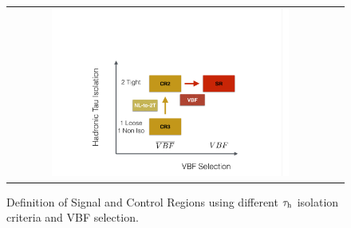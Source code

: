 \begin{figure}[tbh!]
	\centering
	\begin{tabular}{cc}
		\includegraphics[width=0.75\textwidth]{PLOTS/diTauHadLSotherPlots/controlregions13TeV.pdf}
	\end{tabular}
	\caption{Definition of Signal and Control Regions using different $\tau_{\text{h}}$ isolation criteria and VBF selection.}
	\label{fig:crs_13tev}
\end{figure}
